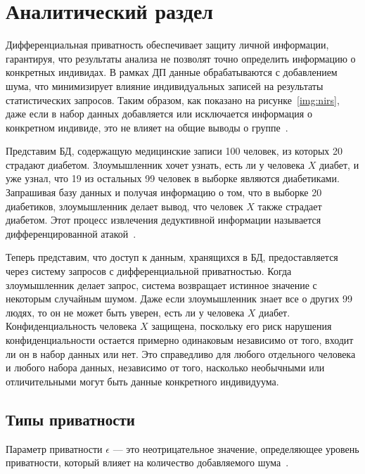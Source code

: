\chapter{Аналитический раздел}

Дифференциальная приватность обеспечивает защиту личной информации, гарантируя, что результаты анализа не позволят точно определить информацию о конкретных индивидах. 
В рамках ДП данные обрабатываются с добавлением шума, что минимизирует влияние индивидуальных записей на результаты статистических запросов.
Таким образом, как показано на рисунке~\ref{img:nirs}, даже если в набор данных добавляется или исключается информация о конкретном индивиде, это не влияет на общие выводы о группе~\cite{Wood2018DifferentialPA}.

Представим БД, содержащую медицинские записи 100 человек, из которых 20 страдают диабетом.
Злоумышленник хочет узнать, есть ли у человека $X$ диабет, и уже узнал, что 19 из остальных 99 человек в выборке являются диабетиками.
Запрашивая базу данных и получая информацию о том, что в выборке 20 диабетиков, злоумышленник делает вывод, что человек
$X$ также страдает диабетом.
Этот процесс извлечения дедуктивной информации называется дифференцированной атакой~\cite{harvard}.

Теперь представим, что доступ к данным, хранящихся в БД, предоставляется через систему запросов с дифференциальной приватностью.
Когда злоумышленник делает запрос, система возвращает истинное значение с некоторым случайным шумом.
Даже если злоумышленник знает все о других 99 людях, то он не может быть уверен, есть ли у человека $X$ диабет.
Конфиденциальность человека $X$ защищена, поскольку его риск нарушения конфиденциальности остается примерно одинаковым независимо от того, входит ли он в набор данных или нет.
Это справедливо для любого отдельного человека и любого набора данных, независимо от того, насколько необычными или отличительными могут быть данные конкретного индивидуума.~\cite{harvard}
\newpage




\section{Типы приватности}

	Параметр приватности $\epsilon$ --- это неотрицательное значение, определяющее уровень приватности, который влияет на количество добавляемого шума~\cite{harvard}.

